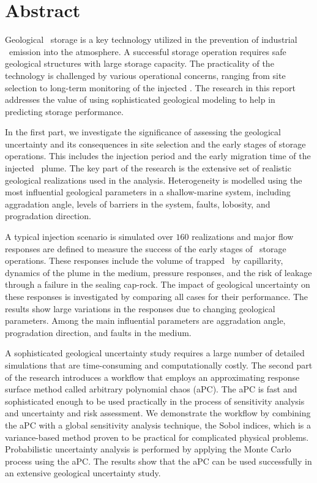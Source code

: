 \chapter{Abstract}
Geological \coo\ storage is a key technology utilized in the prevention of industrial
\coo\ emission into the atmosphere. A successful storage operation requires safe geological structures with large storage capacity. The practicality of the technology is challenged by various operational concerns, ranging from site selection to long-term monitoring of the injected \coo.
The research in this report addresses the value  of using sophisticated geological modeling to help in predicting storage performance. 

In the first part, we investigate the significance of assessing the geological uncertainty and its consequences in site selection and the early stages of storage operations. This includes the injection period and the early migration time of the injected \coo\ plume. The key part of the research is the extensive set of realistic geological realizations used in the analysis. Heterogeneity is modelled using the most influential geological parameters in a shallow-marine system, including aggradation angle, levels of barriers in the system, faults, lobosity, and progradation direction.

A typical injection scenario is simulated over $160$ realizations and major flow responses are defined to measure the success of the early stages of \coo\ storage operations. These responses include the volume of trapped \coo\ by capillarity, dynamics of the plume in the medium, pressure responses, and the risk of leakage through a failure in the sealing cap-rock. The impact of geological uncertainty on these responses is investigated by comparing all cases for their performance. The results show large variations in the responses due to changing geological parameters. Among the main influential parameters are aggradation angle, progradation direction, and faults in the medium.

A sophisticated geological uncertainty study requires a large number of detailed simulations that are time-consuming and computationally costly. The second part of the research introduces a workflow that employs an approximating response surface method called arbitrary polynomial chaos (aPC). The aPC is fast and sophisticated enough to be used practically in the process of sensitivity analysis and uncertainty and risk assessment. We demonstrate the workflow by combining the aPC with a global sensitivity analysis technique, the Sobol indices, which is a variance-based
method proven to be practical for complicated physical problems. Probabilistic uncertainty analysis is performed by applying the Monte Carlo process using the aPC. The results show that the aPC can be used successfully in an extensive geological uncertainty study.

